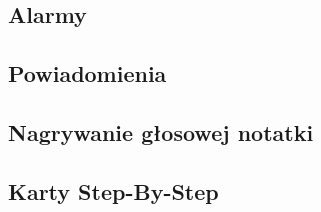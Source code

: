 \subsection{Alarmy}

\subsection{Powiadomienia}

\subsection{Nagrywanie głosowej notatki}
\label{sec:glosowaNotatka}

\subsection{Karty Step-By-Step}

